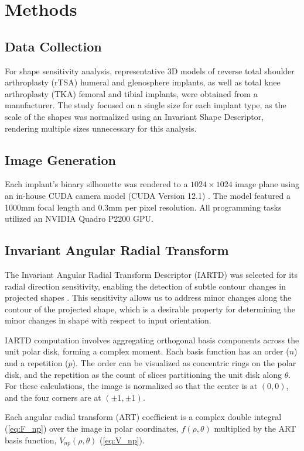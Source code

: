 \section{Methods}

\subsection{Data Collection}
For shape sensitivity analysis, representative 3D models of reverse total shoulder arthroplasty (rTSA) humeral and glenosphere implants, as well as total knee arthroplasty (TKA) femoral and tibial implants, were obtained from a manufacturer.
The study focused on a single size for each implant type, as the scale of the shapes was normalized using an Invariant Shape Descriptor, rendering multiple sizes unnecessary for this analysis.
\subsection{Image Generation}
Each implant's binary silhouette was rendered to a $1024\times 1024$ image plane using an in-house CUDA camera model (CUDA Version 12.1) \cite{nickollsScalableParallelProgramming2008}.
The model featured a 1000mm focal length and 0.3mm per pixel resolution.
All programming tasks utilized an NVIDIA Quadro P2200 GPU.
\subsection{Invariant Angular Radial Transform}
The Invariant Angular Radial Transform Descriptor (IARTD) was selected for its radial direction sensitivity, enabling the detection of subtle contour changes in projected shapes \cite{leeNewShapeDescription2012}.
This sensitivity allows us to address minor changes along the contour of the projected shape, which is a desirable property for determining the minor changes in shape with respect to input orientation.

IARTD computation involves aggregating orthogonal basis components across the unit polar disk, forming a complex moment.
Each basis function has an order ($n$) and a repetition ($p$).
The order can be visualized as concentric rings on the polar disk, and the repetition as the count of slices partitioning the unit disk along $\theta$.
For these calculations, the image is normalized so that the center is at $(0,0)$, and the four corners are at $(\pm1,\pm1)$.

Each angular radial transform (ART) coefficient is a complex double integral (\cref{eq:F_np}) over the image in polar coordinates, $f(\rho,\theta)$ multiplied by the ART basis function, $V_{np}(\rho,\theta)$ (\cref{eq:V_np}).

